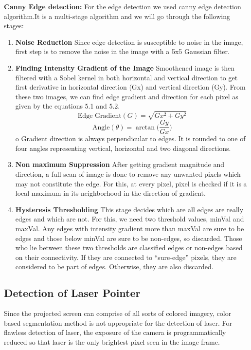 \documentclass[12pt, a4paper]{article}
\begin{document}
\textbf{Canny Edge detection:}
For the edge detection we used canny edge detection algorithm.It is a multi-stage algorithm and we will go through the following stages:
\begin{enumerate}
\item \textbf {Noise Reduction}
Since edge detection is susceptible to noise in the image, first step is to remove the noise in the image with a 5x5 Gaussian filter.

\item \textbf{Finding Intensity Gradient of the Image}
Smoothened image is then filtered with a Sobel kernel in both horizontal and vertical direction to get first derivative in horizontal direction (Gx) and vertical direction (Gy). From these two images, we can find edge gradient and direction for each pixel as given by the equations 5.1 and 5.2.
\begin{equation}
\text{Edge Gradient}(G) = \sqrt{Gx^2 + Gy^2}
\end{equation}
\begin{equation}
\text{Angle}(\theta) = \arctan\bigg(\frac{Gy}{Gx}\bigg)
\end{equation}o
Gradient direction is always perpendicular to edges. It is rounded to one of four angles   representing vertical, horizontal and two diagonal directions.
\item \textbf{Non maximum Suppression}
After getting gradient magnitude and direction, a full scan of image is done to remove any unwanted pixels which may not constitute the edge. For this, at every pixel, pixel is checked ­if it is a local maximum in its neighborhood in the direction of gradient.

\item \textbf{Hysteresis Thresholding}
This stage decides which are all edges are really edges and which are not. For this, we need two threshold values, minVal and maxVal. Any edges with intensity gradient more than maxVal are sure to be edges and those below minVal are sure to be non-edges, so discarded. Those who lie between these two thresholds are classified edges or non-edges based on their connectivity. If they are connected to “sure-edge” pixels, they are considered to be part of edges. Otherwise, they are also discarded.
\end{enumerate}
	
\subsection{Detection of Laser Pointer}
	Since the projected screen can comprise of all sorts of colored imagery, color based segmentation method is not appropriate for the detection of laser. For flawless detection of laser, the exposure of the camera is programmatically reduced so that laser is the only brightest pixel seen in the image frame. 
\end{document}
